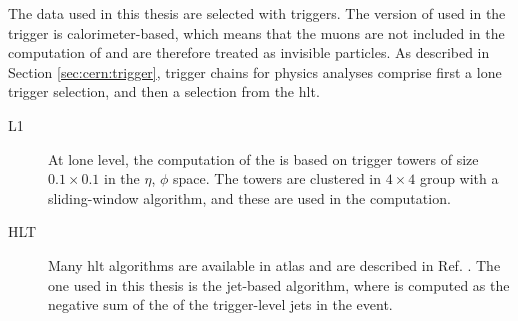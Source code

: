 The data used in this thesis are selected with \met triggers.
The version of \met used in the trigger is calorimeter-based, which means that the muons are not included in the computation of \met and are 
therefore treated as invisible particles.  As described in Section \ref{sec:cern:trigger}, 
trigger chains for physics analyses comprise first a \gls{lone} trigger selection, and then a selection from the \gls{hlt}.
\begin{description}
\item[L1] At \gls{lone} level, the computation of the \met is based on trigger towers of size $0.1\times0.1$ in the $\eta$, $\phi$ space. The towers are clustered in $4\times4$ group with a sliding-window algorithm, and these are used in the \met computation.
\item[HLT] Many \gls{hlt} \met algorithms are available in \gls{atlas} and are described in Ref. \cite{Aaboud:2016leb}. 
The one used in this thesis is the jet-based algorithm, where \met is computed as the negative sum of the \pt of the trigger-level jets in the event.

\end{description}

 
